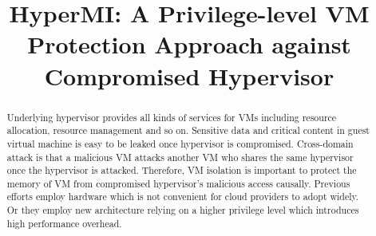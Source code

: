 \documentclass[conference]{IEEEtran}
\begin{document}
\title{HyperMI: A Privilege-level VM Protection Approach against Compromised Hypervisor}
\author{
\IEEEauthorblockA{\textit{Institute of Information Engineering, Chinese Academy of Sciences} \\
\textit{School of Cyber Security, University of Chinese Academy of Sciences}\\
\{liuwenqing,linkunli,zhangkun,tubibo\}@iie.ac.cn}


}

\maketitle

\begin{abstract}

\iffalse
Underlying hypervisor provides all kinds of services for VMs including resource allocation, resource management and so on. Sensitive data and critical content in guest virtual machine is easy to be leaked once hypervisor is compromised. 
Cross-domain attack is that a malicious VM attacks another VM who shares the same hypervisor once the hypervisor is attacked. Therefore, VM isolation is important to protect the memory of VM from compromised hypervisor's malicious access causally. Previous efforts employ hardware which is not convenient for cloud providers to adopt widely. Or they employ new architecture relying on a higher privilege level which introduces high performance overhead.


\end{abstract}
\end{document}

